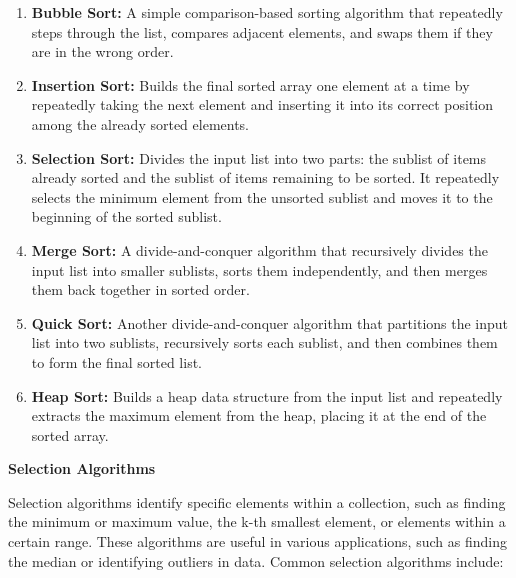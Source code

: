 \documentclass[12pt]{book} %
\begin{document}
\begin{enumerate}
    \item \textbf{Bubble Sort:} A simple comparison-based sorting algorithm that repeatedly steps through the list, compares adjacent elements, and swaps them if they are in the wrong order.
    
    \item \textbf{Insertion Sort:} Builds the final sorted array one element at a time by repeatedly taking the next element and inserting it into its correct position among the already sorted elements.
    
    \item \textbf{Selection Sort:} Divides the input list into two parts: the sublist of items already sorted and the sublist of items remaining to be sorted. It repeatedly selects the minimum element from the unsorted sublist and moves it to the beginning of the sorted sublist.
    
    \item \textbf{Merge Sort:} A divide-and-conquer algorithm that recursively divides the input list into smaller sublists, sorts them independently, and then merges them back together in sorted order.
    
    \item \textbf{Quick Sort:} Another divide-and-conquer algorithm that partitions the input list into two sublists, recursively sorts each sublist, and then combines them to form the final sorted list.
    
    \item \textbf{Heap Sort:} Builds a heap data structure from the input list and repeatedly extracts the maximum element from the heap, placing it at the end of the sorted array.
\end{enumerate}

\textbf{Selection Algorithms}

Selection algorithms identify specific elements within a collection, such as finding the minimum or maximum value, the k-th smallest element, or elements within a certain range. These algorithms are useful in various applications, such as finding the median or identifying outliers in data. Common selection algorithms include:
\end{document}
